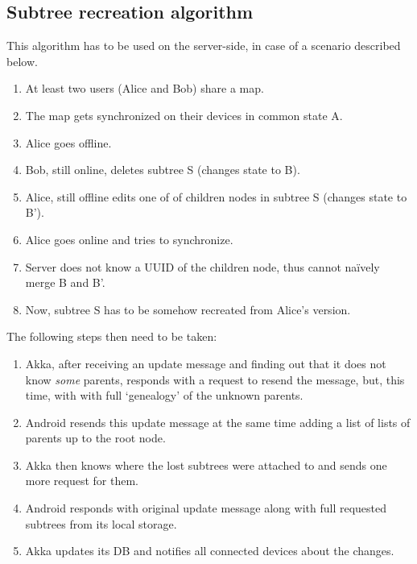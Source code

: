 %
%
%
%
%

\subsection{Subtree recreation algorithm}
\label{subsec:subtree-recreation}

This algorithm has to be used on the server-side, in case of a scenario described below.

\begin{enumerate}
	\item At least two users (Alice and Bob) share a map.
	\item The map gets synchronized on their devices in common state A.
	\item Alice goes offline.
	\item Bob, still online, deletes subtree S (changes state to B).
	\item Alice, still offline edits one of of children nodes in subtree S (changes state to B').
	\item Alice goes online and tries to synchronize.
	\item Server does not know a UUID of the children node, thus cannot naïvely merge B and B'.
	\item Now, subtree S has to be somehow recreated from Alice's version.
\end{enumerate}

The following steps then need to be taken:

\begin{enumerate}
	\item Akka, after receiving an update message and finding out that it does not know \emph{some} parents, responds with a request to resend the message, but, this time, with with full `genealogy' of the unknown parents.
	\item Android resends this update message at the same time adding a list of lists of parents up to the root node.
	\item Akka then knows where the lost subtrees were attached to and sends one more request for them.
	\item Android responds with original update message along with full requested subtrees from its local storage.
	\item Akka updates its DB and notifies all connected devices about the changes.
\end{enumerate}
